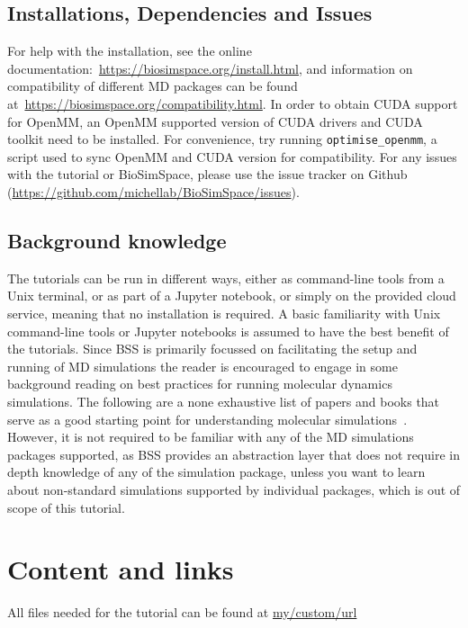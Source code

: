 \documentclass[9pt,tutorial]{livecoms}
\begin{document}
\subsection{Installations, Dependencies and Issues}
\label{subsec:software}
For help with the installation, see the online documentation:~\url{https://biosimspace.org/install.html}, and information on compatibility of different MD packages can be found at~\url{https://biosimspace.org/compatibility.html}. 
In order to obtain CUDA support for OpenMM, an OpenMM supported version of CUDA drivers and CUDA toolkit need to be installed. For convenience, try running \texttt{optimise\_openmm}, a script used to sync OpenMM  and CUDA version for compatibility. For any issues with the tutorial or BioSimSpace, please use the issue tracker on Github (\url{https://github.com/michellab/BioSimSpace/issues}). 

\subsection{Background knowledge}
\label{subsec:background}
The tutorials can be run in different ways, either as command-line tools from a Unix terminal, or as part of a Jupyter notebook, or simply on the provided cloud service, meaning that no installation is required. A basic familiarity with Unix command-line tools or Jupyter notebooks is assumed to have the best benefit of the tutorials. Since BSS is primarily focussed on facilitating the setup and running of MD simulations the reader is encouraged to engage in some background reading on best practices for running molecular dynamics simulations. The following are a none exhaustive list of papers and books that serve as a good starting point for understanding molecular simulations~\cite{braun2019best, frenkel2001understanding, alavi2011statisticala, leimkuhler2015molecular, rapaport2004art}. However, it is not required to be familiar with any of the MD simulations packages supported, as BSS provides an abstraction layer that does not require in depth knowledge of any of the simulation package, unless you want to learn about non-standard simulations supported by individual packages, which is out of scope of this tutorial. 



\section{Content and links}
\label{sec:content}
All files needed for the tutorial can be found at \url{my/custom/url}
\end{document}
